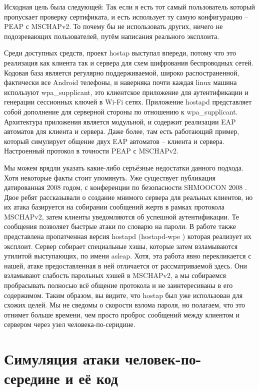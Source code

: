 \documentclass[oneside, final, 14pt]{extarticle}
\begin{document}
Исходная цель была следующей:
Так если я есть тот самый пользователь который пропускает проверку сертификата,
и есть использует ту самую конфигурацию -- PEAP с MSCHAPv2.
То почему бы не использовать других, ничего не подозревающих пользователей,
путём написания реального эксплоита.

Среди доступных средств, проект hostap \cite{hostap-w1fi}
выступал впереди,
потому что это реализация как клиента так и сервера
для схем шифрования беспроводных сетей.
Кодовая база является регулярно поддерживаемой,
широко распостраненной,
фактически все Android телефоны, и наверняка почти каждая
linux машина используют wpa\_supplicant, это клиентское приложение
для аутентификации и генерации сессионных ключей в Wi-Fi сетях.
Приложение hostapd представляет собой дополнение для серверной стороны
по отношению к wpa\_supplicant.
Архитектура приложения является модульной, и содержит реализации
EAP автоматов для клиента и сервера.
Даже более, там есть работающий пример, который симулирует
общение двух EAP автоматов -- клиента и сервера.
Настроенный протокол в точности PEAP с MSCHAPv2.

Мы можем врядли указать какие-либо серъёзные недостатки данного подхода.
Хотя некоторые факты стоит упомянуть.
Уже существует публикация датированная 2008 годом,
с конференции по безопасности SHMOOCON 2008 \cite{whfs-peap-shmoocon-2008}.
Двое ребят рассказывали о создание мнимого сервера для реальных клиентов,
но их атака базируется на собирании сообщений жертв
в рамках протокола MSCHAPv2,
затем клиенты уведомляются об успешной аутентификации.
Те сообщения позволяет быстрые атаки по словарю на пароли.
В работе также представлена пропатченная версия hostapd (hostapd-wpe \cite{hostapd-wpe})
которая реализует их эксплоит.
Сервер собирает специальные хэшы,
которые затем взламываются утилитой выступающих,
по имени asleap.
Хотя, эта работа явно перекликается с нашей,
атаке предоставленная в ней отличается от рассматриваемой
здесь.
Они взламывают слабость парольных хэшей в MSCHAPv2,
а мы собираемся пробрасывать полносью всё общение протокола
и не заинтересиваны в его содержимом.
Таким образом, вы видите, что hostap был уже использован для схожих целей.
Мы не сведомы о скорости взлома пароля,
но полагаем, что это отнимет больше времени, чем просто проброс сообщений
между клиентом и сервером через узел человека-по-серидине.

\cleardoublepage

\section{Симуляция атаки человек-по-середине и её код}
\end{document}
